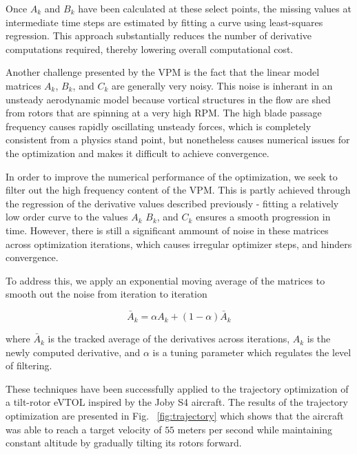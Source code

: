 \documentclass[12pt, letterpaper]{article}
\begin{document}
Once $A_k$ and $B_k$ have been calculated at these select points, the missing values at intermediate time steps are estimated by fitting a curve using least-squares regression.  This approach substantially reduces the number of derivative computations required, thereby lowering overall computational cost. 



Another challenge presented by the VPM is the fact that the linear model matrices $A_k$, $B_k$, and $C_k$ are generally very noisy.  This noise is inherant in an unsteady aerodynamic model because vortical structures in the flow are shed from rotors that are spinning at a very high RPM. The high blade passage frequency causes rapidly oscillating unsteady forces, which is completely consistent from a physics stand point, but nonetheless causes numerical issues for the optimization and makes it difficult to achieve convergence. 

In order to improve the numerical performance of the optimization, we seek to filter out the high frequency content of the VPM.  This is partly achieved through the regression of the derivative values described previously - fitting a relatively low order curve to the values $A_k$ $B_k$, and $C_k$ ensures a smooth progression in time.  However, there is still a significant ammount of noise in these matrices across optimization iterations, which causes irregular optimizer steps, and hinders convergence.

To address this, we apply an exponential moving average of the matrices to smooth out the noise from iteration to iteration

\begin{equation}
\label{eq:EMA}
    \bar{A}_k = \alpha A_k + (1 - \alpha) \bar{A}_k
\end{equation}

where $\bar{A}_k$ is the tracked average of the derivatives across iterations, $A_k$ is the newly computed derivative, and $\alpha$ is a tuning parameter which regulates the level of filtering.

These techniques have been successfully applied to the trajectory optimization of a tilt-rotor eVTOL inspired by the Joby S4 aircraft.  The results of the trajectory optimization are presented in Fig. ~\ref{fig:trajectory} which shows that the aircraft was able to reach a target velocity of $55$ meters per second while maintaining constant altitude by gradually tilting its rotors forward.
\end{document}
